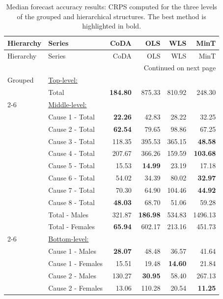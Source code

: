 \begin{center}
\tabcolsep 0.315in
\renewcommand\arraystretch{0.98}
\begin{small}
\begin{longtable}{@{}llrrrr@{}}
\caption{\small Median forecast accuracy results: CRPS computed for the three levels of the grouped and hierarchical structures. The best method is highlighted in bold.}\label{tab:crps_median} \\
\toprule
Hierarchy & Series & CoDA & OLS & WLS & MinT \\
\midrule
\endfirsthead
\toprule
Hierarchy & Series & CoDA & OLS & WLS & MinT \\
\midrule
\endhead
\hline \multicolumn{6}{r}{{Continued on next page}} \\
\endfoot
\endlastfoot
Grouped & \multicolumn{5}{l}{\underline{Top-level:}}\\
& Total & \textbf{184.80} & 875.33 & 810.92 & 248.30 \\
\cmidrule{2-6}
& \multicolumn{5}{l}{\underline{Middle-level:}}\\
& Cause 1 - Total & \textbf{22.26} & 42.83 & 28.22 & 32.25 \\
& Cause 2 - Total & \textbf{62.54} & 79.65 & 98.86 & 67.25 \\
& Cause 3 - Total & 118.35 & 395.53 & 365.15 & \textbf{48.58} \\
& Cause 4 - Total & 207.67 & 366.26 & 159.59 & \textbf{103.68} \\
& Cause 5 - Total & 15.53 & \textbf{14.99} & 23.19 & 17.18 \\
& Cause 6 - Total & 54.02 & 34.39 & 80.02 & \textbf{32.97} \\
& Cause 7 - Total & 70.30 & 64.90 & 104.46 & \textbf{44.92} \\
& Cause 8 - Total & \textbf{48.03} & 68.70 & 51.06 & 59.28 \\
& Total - Males & 321.87 & \textbf{186.98} & 534.83 & 1496.13 \\
& Total - Females & \textbf{65.94} & 602.17 & 213.16 & 451.73 \\
\cmidrule{2-6}
& \multicolumn{5}{l}{\underline{Bottom-level:}}\\
& Cause 1 - Males & \textbf{28.07} & 48.48 & 36.57 & 41.64 \\
& Cause 1 - Females & 15.51 & 19.48 & \textbf{14.60} & 21.84 \\
& Cause 2 - Males & 130.27 & \textbf{30.95} & 58.40 & 267.13 \\
& Cause 2 - Females & 13.06 & 110.28 & 20.54 & \textbf{11.25} \\

\end{longtable}
\end{small}
\end{center}
